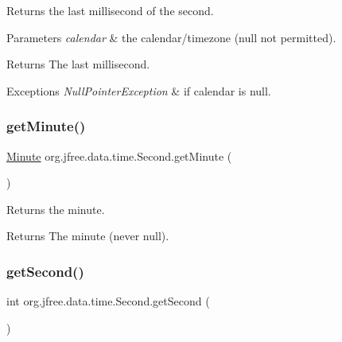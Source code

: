 Returns the last millisecond of the second.


\begin{DoxyParams}{Parameters}
{\em calendar} & the calendar/timezone ({\ttfamily null} not permitted).\\
\hline
\end{DoxyParams}
\begin{DoxyReturn}{Returns}
The last millisecond.
\end{DoxyReturn}

\begin{DoxyExceptions}{Exceptions}
{\em Null\+Pointer\+Exception} & if {\ttfamily calendar} is {\ttfamily null}. \\
\hline
\end{DoxyExceptions}
\mbox{\label{classorg_1_1jfree_1_1data_1_1time_1_1_second_a63d13e976bb85ea05198449217e0fc0f}} 
\subsubsection{\texorpdfstring{get\+Minute()}{getMinute()}}
{\footnotesize\ttfamily \mbox{\hyperlink{classorg_1_1jfree_1_1data_1_1time_1_1_minute}{Minute}} org.\+jfree.\+data.\+time.\+Second.\+get\+Minute (\begin{DoxyParamCaption}{ }\end{DoxyParamCaption})}

Returns the minute.

\begin{DoxyReturn}{Returns}
The minute (never {\ttfamily null}). 
\end{DoxyReturn}
\mbox{\label{classorg_1_1jfree_1_1data_1_1time_1_1_second_a14d76d21578a7d14d87e32d1e37997de}} 
\subsubsection{\texorpdfstring{get\+Second()}{getSecond()}}
{\footnotesize\ttfamily int org.\+jfree.\+data.\+time.\+Second.\+get\+Second (\begin{DoxyParamCaption}{ }\end{DoxyParamCaption})}

